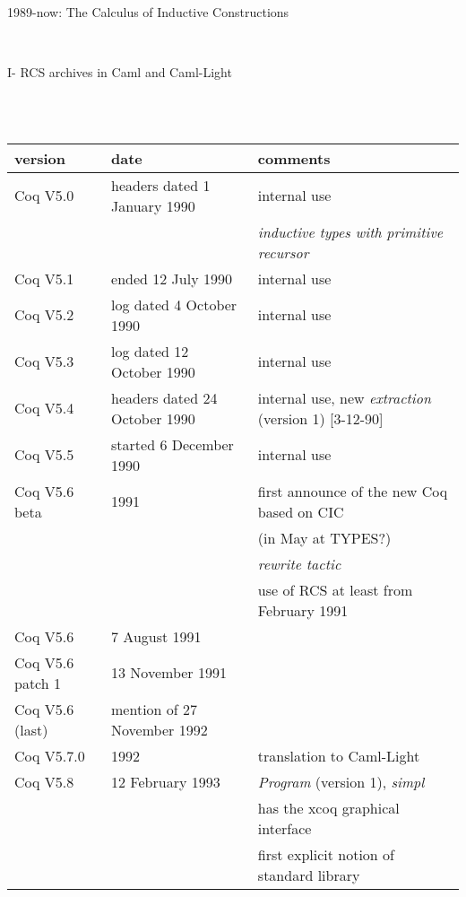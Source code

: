 \documentclass[a4paper]{book}
\newcommand{\feature}[1]{{\em #1}}
\begin{document}
\centerline{\large 1989-now: The Calculus of Inductive Constructions}
\mbox{}\\
\centerline{I- RCS archives in Caml and Caml-Light}
\mbox{}\\
\mbox{}\\
\begin{tabular}{l|l|l}
version & date & comments \\
\hline
Coq V5.0 & headers dated 1 January 1990 & internal use \\
  & & \feature{inductive types with primitive recursor}\\

Coq V5.1 & ended 12 July 1990 & internal use \\

Coq V5.2 & log dated 4 October 1990 & internal use \\

Coq V5.3 & log dated 12 October 1990 & internal use \\

Coq V5.4 & headers dated 24 October 1990 & internal use, new \feature{extraction} (version 1) [3-12-90]\\

Coq V5.5 & started 6 December 1990 & internal use \\

Coq V5.6 beta & 1991 & first announce of the new Coq based on CIC \\
 & & (in May at TYPES?)\\
 & & \feature{rewrite tactic}\\
 & & use of RCS at least from February 1991\\

Coq V5.6& 7 August 1991 & \\

Coq V5.6 patch 1& 13 November 1991 & \\

Coq V5.6 (last) & mention of 27 November 1992\\

Coq V5.7.0& 1992 & translation to Caml-Light \footnotemark\\

Coq V5.8& 12 February 1993 & \feature{Program} (version 1), \feature{simpl}\\

& & has the xcoq graphical interface\\

& & first explicit notion of standard library\\


\end{tabular}
\end{document}
